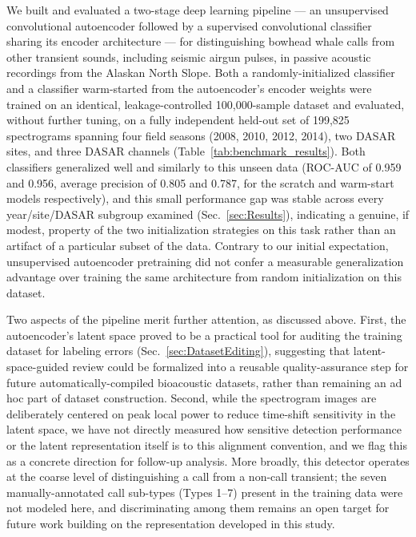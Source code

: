 \documentclass[preprint,NumberedRefs]{JASAnew}
\begin{document}
We built and evaluated a two-stage deep learning pipeline — an unsupervised
convolutional autoencoder followed by a supervised convolutional classifier
sharing its encoder architecture — for distinguishing bowhead whale calls
from other transient sounds, including seismic airgun pulses, in passive
acoustic recordings from the Alaskan North Slope. Both a randomly-initialized
classifier and a classifier warm-started from the autoencoder's encoder
weights were trained on an identical, leakage-controlled 100,000-sample
dataset and evaluated, without further tuning, on a fully independent
held-out set of 199,825 spectrograms spanning four field seasons (2008,
2010, 2012, 2014), two DASAR sites, and three DASAR channels
(Table~\ref{tab:benchmark_results}). Both classifiers generalized well and
similarly to this unseen data (ROC-AUC of 0.959 and 0.956, average precision
of 0.805 and 0.787, for the scratch and warm-start models respectively), and
this small performance gap was stable across every year/site/DASAR subgroup
examined (Sec.~\ref{sec:Results}), indicating a genuine, if modest, property
of the two initialization strategies on this task rather than an artifact of
a particular subset of the data. Contrary to our initial expectation,
unsupervised autoencoder pretraining did not confer a measurable
generalization advantage over training the same architecture from random
initialization on this dataset.

Two aspects of the pipeline merit further attention, as discussed above.
First, the autoencoder's latent space proved to be a practical tool for
auditing the training dataset for labeling errors (Sec.~\ref{sec:DatasetEditing}),
suggesting that latent-space-guided review could be formalized into a
reusable quality-assurance step for future automatically-compiled bioacoustic
datasets, rather than remaining an ad hoc part of dataset construction.
Second, while the spectrogram images are deliberately centered on peak local
power to reduce time-shift sensitivity in the latent space, we have not
directly measured how sensitive detection performance or the latent
representation itself is to this alignment convention, and we flag this as a
concrete direction for follow-up analysis. More broadly, this detector
operates at the coarse level of distinguishing a call from a non-call
transient; the seven manually-annotated call sub-types (Types 1--7) present
in the training data were not modeled here, and discriminating among them
remains an open target for future work building on the representation
developed in this study.
\end{document}
